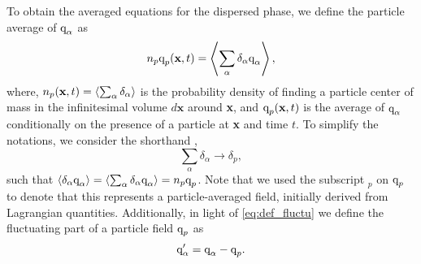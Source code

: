 To obtain the averaged equations for the dispersed phase, we define the particle average of $\text q_\alpha$​ as
\begin{equation}
     n_p \text q_p(\textbf{x},t) = \left<\sum_\alpha\delta_\alpha \text q_\alpha\right>,
     \label{eq:p_avg}
\end{equation}
where, $n_p(\textbf{x},t) = \left<\sum_\alpha \delta_\alpha\right>$ is the probability density of finding a particle center of mass in the infinitesimal volume $d\textbf{x}$ around \textbf{x}, and $\text q_p(\textbf{x},t)$ is the average of $\text q_\alpha$ conditionally on the presence of a particle at \textbf{x} and time $t$. 
To simplify the notations, we consider the shorthand \citep{lhuillier1998},
\begin{equation*}
    \sum_\alpha \delta_\alpha \to \delta_p, 
\end{equation*}
such that $\left<\delta_\alpha \text q_\alpha\right>=\left<\sum_\alpha \delta_\alpha \text q_\alpha\right>=n_p\text q_p$.
Note that we used the subscript $_p$ on $\text q_p$ to denote that this represents a particle-averaged field, initially derived from Lagrangian quantities. 
Additionally, in light of \ref{eq:def_fluctu} we define the fluctuating part of a particle field $\text q_p$ as
\begin{equation}
    \text q_\alpha' = \text q_\alpha - \text q_p. 
    \label{eq:def_fluc_p}
\end{equation}

